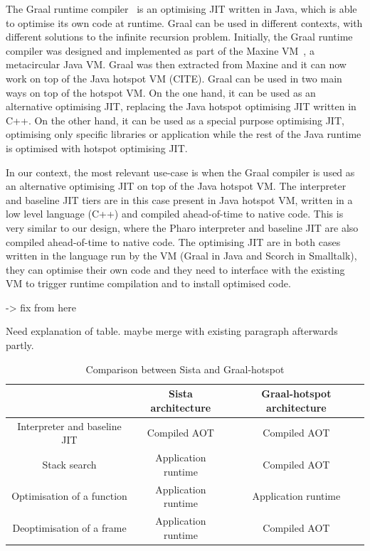 \documentclass[a4paper,12pt,twoside]{../includes/ThesisStyle}
\begin{document}
The Graal runtime compiler~\cite{Oracle13,Dubo13c} is an optimising JIT written in Java, which is able to optimise its own code at runtime. Graal can be used in different contexts, with different solutions to the infinite recursion problem. Initially, the Graal runtime compiler was designed and implemented as part of the Maxine VM~\cite{Wimm13a}, a metacircular Java VM. Graal was then extracted from Maxine and it can now work on top of the Java hotspot VM (CITE). Graal can be used in two main ways on top of the hotspot VM. On the one hand, it can be used as an alternative optimising JIT, replacing the Java hotspot optimising JIT written in C++. On the other hand, it can be used as a special purpose optimising JIT, optimising only specific libraries or application while the rest of the Java runtime is optimised with hotspot optimising JIT. %

In our context, the most relevant use-case is when the Graal compiler is used as an alternative optimising JIT on top of the Java hotspot VM. The interpreter and baseline JIT tiers are in this case present in Java hotspot VM, written in a low level language (C++) and compiled ahead-of-time to native code. This is very similar to our design, where the Pharo interpreter and baseline JIT are also compiled ahead-of-time to native code. The optimising JIT are in both cases written in the language run by the VM (Graal in Java and Scorch in Smalltalk), they can optimise their own code and they need to interface with the existing VM to trigger runtime compilation and to install optimised code.

-> fix from here

Need explanation of table. maybe merge with existing paragraph afterwards partly.

\begin{table}
  \caption{Comparison between Sista and Graal-hotspot}
  \vspace{0.1cm}
  \centering
  \begin{tabular}{ c || c | c }
    \toprule
     & Sista architecture & Graal-hotspot architecture \\
    \midrule
	Interpreter and baseline JIT & Compiled AOT & Compiled AOT \\
	Stack search & Application runtime & Compiled AOT \\
	Optimisation of a function & Application runtime & Application runtime \\
	Deoptimisation of a frame & Application runtime & Compiled AOT \\
  \end{tabular}
  \label{tbl:banane}
\end{table}
\end{document}
